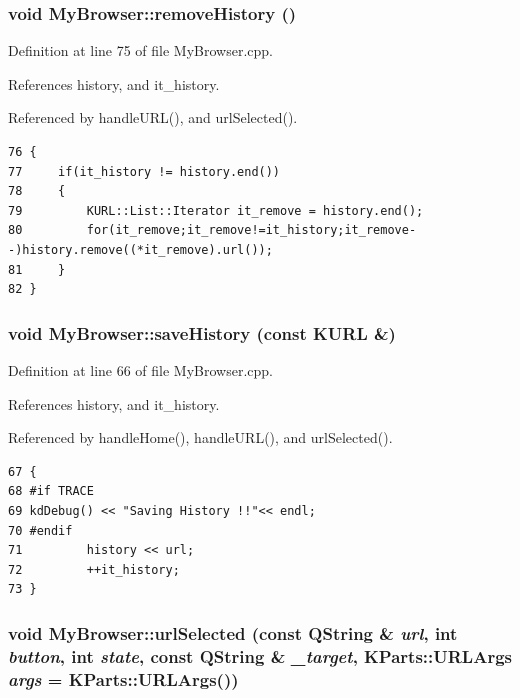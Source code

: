 \subsubsection{\setlength{\rightskip}{0pt plus 5cm}void My\-Browser::remove\-History ()}\label{classMyBrowser_MyBrowsera4}




Definition at line 75 of file My\-Browser.cpp.

References history, and it\_\-history.

Referenced by handle\-URL(), and url\-Selected().



\footnotesize\begin{verbatim}76 {
77     if(it_history != history.end())
78     {
79         KURL::List::Iterator it_remove = history.end();
80         for(it_remove;it_remove!=it_history;it_remove--)history.remove((*it_remove).url());
81     }
82 }
\end{verbatim}\normalsize 
{}
\subsubsection{\setlength{\rightskip}{0pt plus 5cm}void My\-Browser::save\-History (const KURL \&)}\label{classMyBrowser_MyBrowsera3}




Definition at line 66 of file My\-Browser.cpp.

References history, and it\_\-history.

Referenced by handle\-Home(), handle\-URL(), and url\-Selected().



\footnotesize\begin{verbatim}67 {
68 #if TRACE 
69 kdDebug() << "Saving History !!"<< endl;
70 #endif
71         history << url;      
72         ++it_history;
73 }
\end{verbatim}\normalsize 
{}
\subsubsection{\setlength{\rightskip}{0pt plus 5cm}void My\-Browser::url\-Selected (const QString \& {\em url}, int {\em button}, int {\em state}, const QString \& {\em \_\-target}, KParts::URLArgs {\em args} = KParts::URLArgs())}\label{classMyBrowser_MyBrowsera2}




